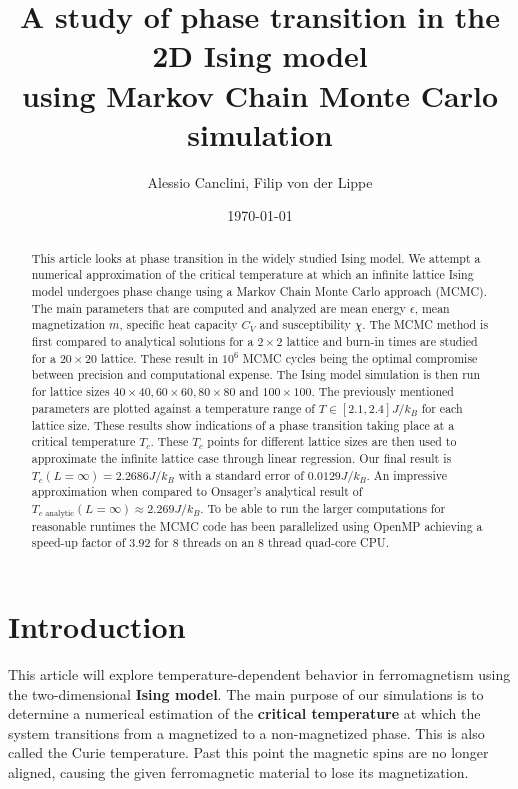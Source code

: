 \documentclass[english,notitlepage,reprint,nofootinbib]{revtex4-1}  %
\begin{document}
\title{A study of phase transition in the 2D Ising model\\using Markov Chain Monte Carlo simulation}  %
\author{Alessio Canclini, Filip von der Lippe} %
\date{\today}                             %
\noaffiliation                            %

\begin{abstract}
    This article looks at phase transition in the widely studied Ising model. We attempt a numerical approximation of the critical temperature at which an infinite lattice Ising model undergoes phase change using a Markov Chain Monte Carlo approach (MCMC). The main parameters that are computed and analyzed are mean energy $\epsilon$, mean magnetization $m$, specific heat capacity $C_V$ and susceptibility $\chi$. The MCMC method is first compared to analytical solutions for a $2 \times 2$ lattice and burn-in times are studied for a $20 \times 20$ lattice. These result in $10^6$ MCMC cycles being the optimal compromise between precision and computational expense. The Ising model simulation is then run for lattice sizes $40 \times 40, 60 \times 60, 80 \times 80$ and $100\times 100$. The previously mentioned parameters are plotted against a temperature range of $T \in [2.1,2.4]J/k_B$ for each lattice size. These results show indications of a phase transition taking place at a critical temperature $T_c$. These $T_c$ points for different lattice sizes are then used to approximate the infinite lattice case through linear regression. Our final result is $T_c(L=\infty) = 2.2686 J/k_B$ with a standard error of $0.0129 J/k_B$. An impressive approximation when compared to Onsager's analytical result of  $T_{c \text{ analytic}}(L=\infty) \approx 2.269 J/k_B$. To be able to run the larger computations for reasonable runtimes the MCMC code has been parallelized using OpenMP achieving a speed-up factor of $3.92$ for 8 threads on an 8 thread quad-core CPU. 
\end{abstract}
\maketitle
\raggedbottom


\section{Introduction}\label{sec:intro}
This article will explore temperature-dependent behavior in ferromagnetism using the two-dimensional \textbf{Ising model}. The main purpose of our simulations is to determine a numerical estimation of the \textbf{critical temperature} at which the system transitions from a magnetized to a non-magnetized phase. This is also called the Curie temperature. Past this point the magnetic spins are no longer aligned, causing the given ferromagnetic material to lose its magnetization.
\end{document}
